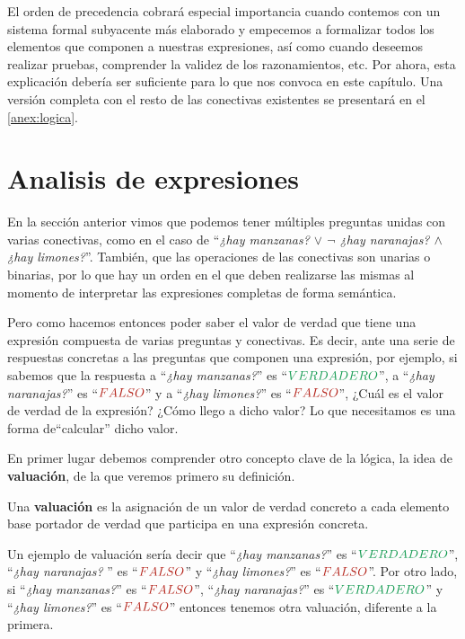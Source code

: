 El orden de precedencia cobrará especial importancia cuando contemos con un
sistema formal subyacente más elaborado y empecemos a formalizar todos los
elementos que componen a nuestras expresiones, así como cuando deseemos realizar
pruebas, comprender la validez de los razonamientos, etc. Por ahora, esta
explicación debería ser suficiente para lo que nos convoca en este capítulo. Una
versión completa con el resto de las conectivas existentes se presentará en el
\autoref{anex:logica}.

\section{Analisis de expresiones}
\label{chap:logica:sec:analisis_expresiones}

En la sección anterior vimos que podemos tener múltiples preguntas unidas con
varias conectivas, como en el caso de ``\textit{¿hay manzanas? $\lor$ $\lnot$
¿hay naranajas? $\land$ ¿hay limones?}''. También, que las operaciones de las
conectivas son unarias o binarias, por lo que hay un orden en el que deben
realizarse las mismas al momento de interpretar las expresiones completas de
forma semántica.

Pero como hacemos entonces poder saber el valor de verdad que tiene una
expresión compuesta de varias preguntas y conectivas. Es decir, ante una serie
de respuestas concretas a las preguntas que componen una expresión, por ejemplo,
si sabemos que la respuesta a ``\textit{¿hay manzanas?}'' es ``$\ltruefull$'', a
``\textit{¿hay naranajas?}'' es ``$\lfalsefull$'' y a ``\textit{¿hay limones?}''
es ``$\lfalsefull$'', ¿Cuál es el valor de verdad de la expresión? ¿Cómo llego a
dicho valor? Lo que necesitamos es una forma de``calcular'' dicho valor.

En primer lugar debemos comprender otro concepto clave de la lógica, la idea de
\textbf{valuación}, de la que veremos primero su definición.

\begin{definition} Una \textbf{valuación} es la
    asignación de un valor de verdad concreto a cada elemento base portador de
    verdad que participa en una expresión concreta.
\end{definition}

Un ejemplo de valuación sería decir que ``\textit{¿hay manzanas?}'' es
``$\ltruefull$'', ``\textit{¿hay naranajas?} '' es ``$\lfalsefull$'' y
``\textit{¿hay limones?}'' es ``$\lfalsefull$''. Por otro lado, si
``\textit{¿hay manzanas?}'' es ``$\lfalsefull$'', ``\textit{¿hay naranajas?}''
es ``$\ltruefull$'' y ``\textit{¿hay limones?}'' es ``$\lfalsefull$'' entonces
tenemos otra valuación, diferente a la primera.


